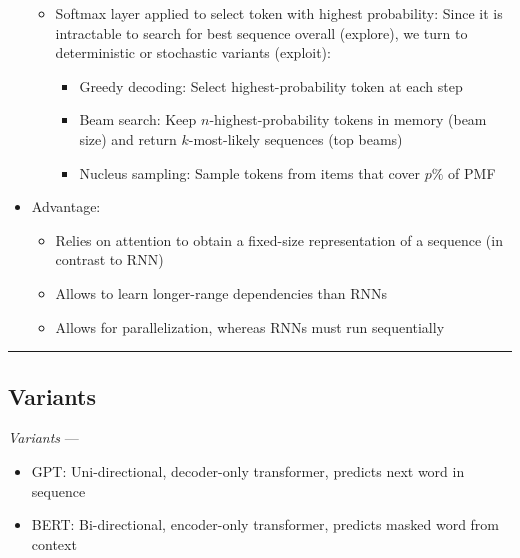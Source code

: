 \begin{itemize}
\begin{itemize}
        \item Softmax layer applied to select token with highest probability: Since it is intractable to search for best sequence overall (explore), we turn to deterministic or stochastic variants (exploit): 
        \begin{itemize}
            \item Greedy decoding: Select highest-probability token at each step
            \item Beam search: Keep $n$-highest-probability tokens in memory (beam size) and return $k$-most-likely sequences (top beams)
            \item Nucleus sampling: Sample tokens from items that cover $p\%$ of PMF
        \end{itemize}
    \end{itemize}
    \item Advantage: 
    \begin{itemize}
        \item Relies on attention to obtain a fixed-size representation of a sequence (in contrast to RNN)
        \item Allows to learn longer-range dependencies than RNNs
        \item Allows for parallelization, whereas RNNs must run sequentially
    \end{itemize}
\end{itemize}

{\color{black}\hrule height 0.001mm}

\subsection*{Variants}
\emph{Variants} --- 
\begin{itemize}
    \item GPT: Uni-directional, decoder-only transformer, predicts next word in sequence
    \item BERT: Bi-directional, encoder-only transformer, predicts masked word from context
\end{itemize}